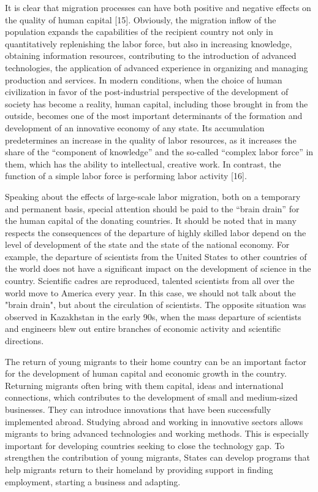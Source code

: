 It is clear that migration processes can have both positive and negative
effects on the quality of human capital {[}15{]}. Obviously, the
migration inflow of the population expands the capabilities of the
recipient country not only in quantitatively replenishing the labor
force, but also in increasing knowledge, obtaining information
resources, contributing to the introduction of advanced technologies,
the application of advanced experience in organizing and managing
production and services. In modern conditions, when the choice of human
civilization in favor of the post-industrial perspective of the
development of society has become a reality, human capital, including
those brought in from the outside, becomes one of the most important
determinants of the formation and development of an innovative economy
of any state. Its accumulation predetermines an increase in the quality
of labor resources, as it increases the share of the ``component of
knowledge'' and the so-called ``complex labor force'' in them, which has
the ability to intellectual, creative work. In contrast, the function of
a simple labor force is performing labor activity {[}16{]}.

Speaking about the effects of large-scale labor migration, both on a
temporary and permanent basis, special attention should be paid to the
``brain drain'' for the human capital of the donating countries. It
should be noted that in many respects the consequences of the departure
of highly skilled labor depend on the level of development of the state
and the state of the national economy. For example, the departure of
scientists from the United States to other countries of the world does
not have a significant impact on the development of science in the
country. Scientific cadres are reproduced, talented scientists from all
over the world move to America every year. In this case, we should not
talk about the "brain drain", but about the circulation of scientists.
The opposite situation was observed in Kazakhstan in the early 90s, when
the mass departure of scientists and engineers blew out entire branches
of economic activity and scientific directions.

The return of young migrants to their home country can be an important
factor for the development of human capital and economic growth in the
country. Returning migrants often bring with them capital, ideas and
international connections, which contributes to the development of small
and medium-sized businesses. They can introduce innovations that have
been successfully implemented abroad. Studying abroad and working in
innovative sectors allows migrants to bring advanced technologies and
working methods. This is especially important for developing countries
seeking to close the technology gap. To strengthen the contribution of
young migrants, States can develop programs that help migrants return to
their homeland by providing support in finding employment, starting a
business and adapting.

